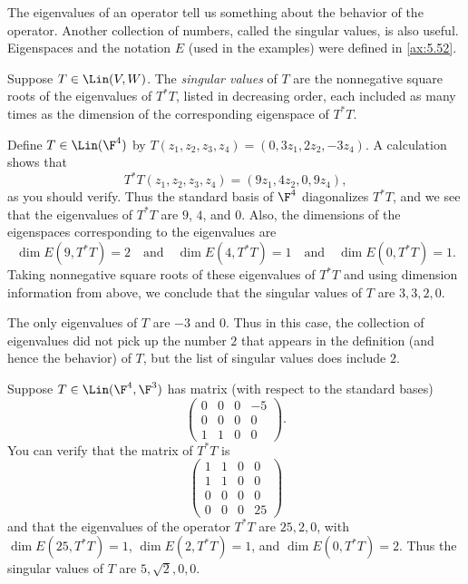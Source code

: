 The eigenvalues of an operator tell us something about the behavior of the
operator. Another collection of numbers, called the singular values, is also
useful. Eigenspaces and the notation $E$ (used in the examples) were defined in
\ref{ax:5.52}.

\begin{definition}\label{ax:7.65}
Suppose $T\in\Lin(V,W)$. The \emph{singular values} of $T$ are the nonnegative
square roots of the eigenvalues of $T^*T$, listed in decreasing order, each
included as many times as the dimension of the corresponding eigenspace of
$T^*T$.
\end{definition}

\begin{example}\label{ax:7.66}
Define $T\in\Lin(\F^4)$ by $T(z_1,z_2,z_3,z_4)=\allowbreak(0,3z_1,2z_2,-3z_4)$. A
calculation shows that
\[ T^*T(z_1,z_2,z_3,z_4) = (9z_1,4z_2,0,9z_4), \]
as you should verify. Thus the standard basis of $\F^4$ diagonalizes $T^*T$,
and we see that the eigenvalues of $T^*T$ are $9$, $4$, and $0$. Also, the
dimensions of the eigenspaces corresponding to the eigenvalues are
\[ \dim E(9,T^*T)=2 \quad\text{and}\quad \dim E(4,T^*T)=1 \quad\text{and}\quad
   \dim E(0,T^*T)=1. \]
Taking nonnegative square roots of these eigenvalues of $T^*T$ and using
dimension information from above, we conclude that the singular values of $T$
are $3,3,2,0$.

The only eigenvalues of $T$ are $-3$ and $0$. Thus in this case, the collection
of eigenvalues did not pick up the number $2$ that appears in the definition
(and hence the behavior) of $T$, but the list of singular values does include
$2$.
\end{example}

\begin{example}\label{ax:7.67}
Suppose $T\in\Lin(\F^4,\F^3)$ has matrix (with respect to the standard bases)
\[ \begin{pmatrix} 0&0&0&-5\\ 0&0&0&0\\ 1&1&0&0 \end{pmatrix}. \]
You can verify that the matrix of $T^*T$ is
\[ \begin{pmatrix} 1&1&0&0\\ 1&1&0&0\\ 0&0&0&0\\ 0&0&0&25 \end{pmatrix} \]
and that the eigenvalues of the operator $T^*T$ are $25,2,0$, with
$\dim E(25,T^*T)=1$, $\dim E(2,T^*T)=1$, and $\dim E(0,T^*T)=2$. Thus the
singular values of $T$ are $5,\sqrt2,0,0$.
\end{example}

